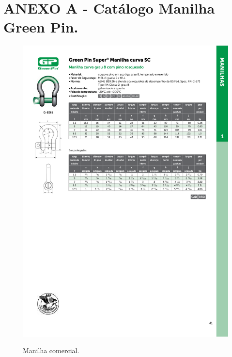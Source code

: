 \captionsetup[figure]{list=no} %


\chapter*{ANEXO A - Catálogo Manilha Green Pin.}
\label{anexoA}
\begin{figure}[!htb]
   \centering
    \caption{Manilha comercial.}
    \includegraphics[width=0.85\linewidth, trim = 0 0 0 0, clip]{Figuras/Green Pin Super Manilha curva SC folha.png}\\
    \hspace{1.5cm}\raggedright \fontsize{10}{12}
    \label{catalogomanilha}
\end{figure}




